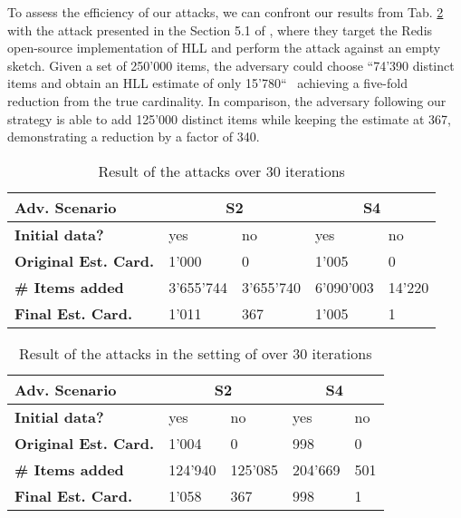 \documentclass{IEEEtran}
\begin{document}
To assess the efficiency of our attacks, we can confront our results from Tab. \ref{table:tab2} with the attack presented in the Section 5.1 of \cite{hllvuln}, where they target the Redis \cite{redishll} open-source implementation of HLL and perform the attack against an empty sketch. Given a set of 250'000 items, the adversary could choose ``74'390 distinct items and obtain an HLL estimate of only 15'780``~\cite{hllvuln} achieving a five-fold reduction from the true cardinality. In comparison, the adversary following our strategy is able to add 125'000 distinct items while keeping the estimate at 367, demonstrating a reduction by a factor of 340.

\begin{table}[h]
\caption{Result of the attacks over 30 iterations}
\begin{tabular}{| m{8.5em} | m{4em} | m{4em} | m{4em} | m{4em} |}
    \hline
    \textbf{Adv. Scenario} & \multicolumn{2}{c|}{S2} & \multicolumn{2}{c|}{S4} \\ \hline
    \textbf{Initial data?} & yes & no & yes & no \\ \hline
    \textbf{Original Est. Card.} & 1'000 & 0 & 1'005 & 0 \\ \hline
    \textbf{\# Items added} & 3'655'744 & 3'655'740 & 6'090'003 & 14'220 \\ \hline
    \textbf{Final Est. Card.} & 1'011 & 367 & 1'005 & 1 \\ \hline
\end{tabular}
\label{table:tab1}
\end{table}

\begin{table}[h]
\caption{Result of the attacks in the setting of \cite{hllvuln} over 30 iterations}
\begin{tabular}{| m{8.5em} | m{4em} | m{4em} | m{4em} | m{4em} |}
    \hline
    \textbf{Adv. Scenario} & \multicolumn{2}{c|}{S2} & \multicolumn{2}{c|}{S4} \\ \hline
    \textbf{Initial data?} & yes & no & yes & no \\ \hline
    \textbf{Original Est. Card.} & 1'004 & 0 & 998 & 0 \\ \hline
    \textbf{\# Items added} & 124'940 & 125'085 & 204'669 & 501 \\ \hline
    \textbf{Final Est. Card.} & 1'058 & 367 & 998 & 1 \\ \hline
\end{tabular}
\label{table:tab2}
\end{table}
\end{document}
